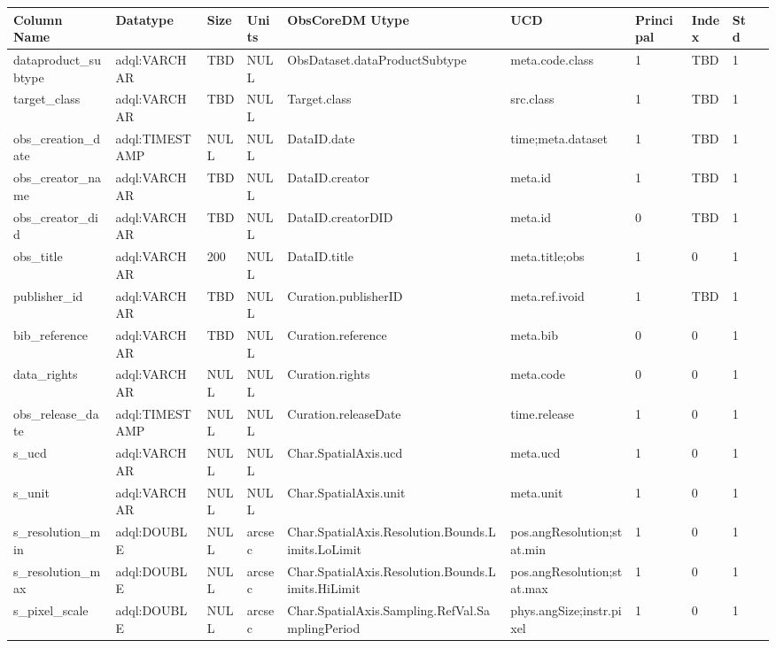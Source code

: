 \documentclass[11pt,a4paper]{ivoa}
\begin{document}
\begin{tabular}{|l|p{}|p{}|p{}|p{}|
  p{}|p{}|p{}|p{}|p{}|}
\hline
Column Name & Datatype & Size & Units & ObsCoreDM Utype & UCD & Principal & Index & Std\\\hline
dataproduct\_subtype &
adql:VARCHAR &
TBD &
NULL &
ObsDataset.dataProductSubtype &
meta.code.class &
1 &
TBD &
1\\\hline
target\_class &
adql:VARCHAR &
TBD &
NULL &
Target.class &
src.class &
1 &
TBD &
1\\\hline
obs\_creation\_date &
adql:TIMESTAMP &
NULL &
NULL &
DataID.date &
time;meta.dataset &
1 &
TBD &
1\\\hline
obs\_creator\_name   &
adql:VARCHAR &
TBD &
NULL &
DataID.creator &
meta.id &
1 &
TBD &
1\\\hline
obs\_creator\_did &
adql:VARCHAR &
TBD &
NULL &
DataID.creatorDID &
meta.id &
0 &
TBD &
1\\\hline
obs\_title &
adql:VARCHAR &
200 &
NULL &
DataID.title &
meta.title;obs &
1 &
0 &
1\\\hline
publisher\_id   &
adql:VARCHAR &
TBD &
NULL &
Curation.publisherID &
meta.ref.ivoid &
1 &
TBD &
1\\\hline
bib\_reference   &
adql:VARCHAR &
TBD &
NULL &
Curation.reference &
meta.bib &
0 &
0 &
1\\\hline
data\_rights   &
adql:VARCHAR &
NULL &
 NULL &
Curation.rights &
meta.code &
0 &
0 &
1\\\hline
obs\_release\_date &
adql:TIMESTAMP &
NULL &
NULL &
Curation.releaseDate &
time.release &
1 &
0 &
1\\\hline
s\_ucd   &
adql:VARCHAR &
NULL &
NULL &
Char.SpatialAxis.ucd &
meta.ucd &
1 &
0 &
1\\\hline
s\_unit   &
adql:VARCHAR &
NULL &
NULL &
Char.SpatialAxis.unit &
meta.unit &
1 &
0 &
1\\\hline
s\_resolution\_min &
adql:DOUBLE &
NULL &
arcsec &
Char.SpatialAxis.Resolution.Bounds.Limits.LoLimit &
pos.angResolution;stat.min &
1 &
0 &
1\\\hline
s\_resolution\_max &
adql:DOUBLE &
NULL &
arcsec &
Char.SpatialAxis.Resolution.Bounds.Limits.HiLimit &
pos.angResolution;stat.max &
1 &
0 &
1\\\hline
s\_pixel\_scale &
adql:DOUBLE &
NULL &
arcsec &
Char.SpatialAxis.Sampling.RefVal.SamplingPeriod &
phys.angSize;instr.pixel &
1 &
0 &
1\\\hline

\end{tabular}
\end{document}
